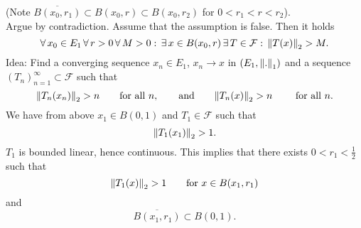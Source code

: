 \begin{beweis}
\begin{enumerate}[step 1:]
\[			\]
			(Note $\overline{B(x_0,r_1)} \subset B(x_0,r) \subset B(x_0,r_2)$ for $0 < r_1 < r < r_2$). \\
			Argue by contradiction. Assume that the assumption is false. Then it holds
			\[
				\forall\, x_0 \in E_1 \, \forall\, r >0 \,\forall\,  M>0: \,\exists\, x \in B(x_0,r) \,\exists\, T \in \mathcal{F} : \, \norm{T(x)}_2 > M.
			\]
			Idea: Find a converging sequence $x_n \in E_1$, $x_n \to x$ in $(E_1,\norm{.}_1)$ and a sequence $(T_n)_{n=1}^{\infty} \subset \mathcal{F}$ such that
			\[
				\norm{T_n(x_n)}_2 > n \qquad \text{for all }n, \qquad \text{and} \qquad \norm{T_n(x)}_2 > n \qquad \text{ for all }n.
			\]
			We have from above $x_1 \in B(0,1)$ and $T_1 \in  \mathcal{F}$ such that \[
				\norm{T_1(x_1)}_2 > 1.
			\] $T_1$ is bounded linear, hence continuous. This implies that there exists $0<r_1 < \frac{1}{2}$ such that
			\[
				\norm{T_1(x)}_2 >1 \qquad \text{for }x \in B(x_1,r_1)
			\]
			and \[
				\overline{B(x_1,r_1)}\subset B(0,1).
			\]
		\end{enumerate}
	\end{beweis}
\cleardoubleoddemptypage
{}
\setcounter{page}{1}

